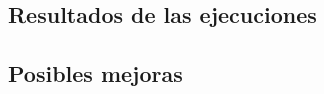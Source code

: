 \documentclass[12pt,a4paper]{article}
\begin{document}
\subsection{Resultados de las ejecuciones}
\subsection{Posibles mejoras}
\end{document}
